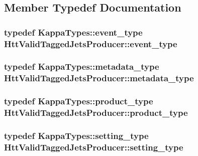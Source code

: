 \subsection{Member Typedef Documentation}
\hypertarget{classHttValidTaggedJetsProducer_a3bc1d36fed6d4f463a6a31a9d6198e44}{
\subsubsection[{event\_\-type}]{\setlength{\rightskip}{0pt plus 5cm}typedef KappaTypes::event\_\-type {\bf HttValidTaggedJetsProducer::event\_\-type}}}
\label{classHttValidTaggedJetsProducer_a3bc1d36fed6d4f463a6a31a9d6198e44}
\hypertarget{classHttValidTaggedJetsProducer_afd0b781e5d24d02788c7e29a4634389a}{
\subsubsection[{metadata\_\-type}]{\setlength{\rightskip}{0pt plus 5cm}typedef KappaTypes::metadata\_\-type {\bf HttValidTaggedJetsProducer::metadata\_\-type}}}
\label{classHttValidTaggedJetsProducer_afd0b781e5d24d02788c7e29a4634389a}
\hypertarget{classHttValidTaggedJetsProducer_a0a3a5df44dc79ee735fb2d118df5e2e9}{
\subsubsection[{product\_\-type}]{\setlength{\rightskip}{0pt plus 5cm}typedef KappaTypes::product\_\-type {\bf HttValidTaggedJetsProducer::product\_\-type}}}
\label{classHttValidTaggedJetsProducer_a0a3a5df44dc79ee735fb2d118df5e2e9}
\hypertarget{classHttValidTaggedJetsProducer_aaf69d5b37684a121c6bf3651ece90d0c}{
\subsubsection[{setting\_\-type}]{\setlength{\rightskip}{0pt plus 5cm}typedef KappaTypes::setting\_\-type {\bf HttValidTaggedJetsProducer::setting\_\-type}}}
